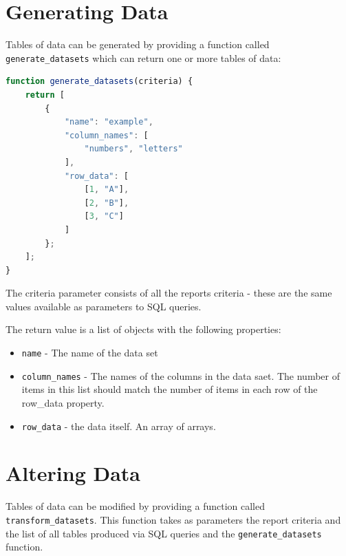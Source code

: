 \documentclass[a4paper,10pt]{book}
\begin{document}
\section{Generating Data}
Tables of data can be generated by providing a function called \verb|generate_datasets| which can return one or more tables of data:

\begin{lstlisting}[language=javascript]
function generate_datasets(criteria) {
	return [
		{
			"name": "example",
			"column_names": [
				"numbers", "letters"
			],
			"row_data": [
				[1, "A"],
				[2, "B"],
				[3, "C"]
			]
		};
	];
}
\end{lstlisting}

The criteria parameter consists of all the reports criteria - these are the same values available as parameters to SQL queries.

The return value is a list of objects with the following properties:
\begin{itemize}
\item \verb|name| - The name of the data set
\item \verb|column_names| - The names of the columns in the data saet. The number of items in this list should match the number of items in each row of the row\_data property.
\item \verb|row_data| - the data itself. An array of arrays.
\end{itemize}

\section{Altering Data}
Tables of data can be modified by providing a function called \verb|transform_datasets|. This function takes as parameters the report criteria and the list of all tables produced
via SQL queries and the \verb|generate_datasets| function.
\end{document}
